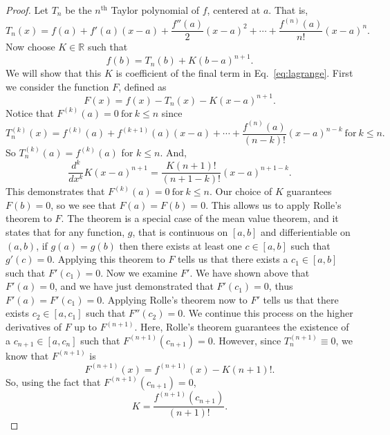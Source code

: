 \documentclass[12pt,twocolumn]{article}
\begin{document}
\begin{proof}
Let $T_n$ be the $n^\mathrm{th}$ Taylor polynomial of $f$, centered at $a$. That is,
\begin{equation}
T_n(x) = f(a) + f'(a)(x-a) + \frac{f''(a)}{2}(x-a)^2 + \cdots + \frac{f^{(n)}(a)}{n!}(x-a)^n.
\end{equation}
Now choose $K\in\mathbb{R}$ such that
\begin{equation}
\label{eq:K}
f(b) = T_n(b) + K(b-a)^{n+1}.
\end{equation}
We will show that this $K$ is coefficient of the final term in Eq.~\ref{eq:lagrange}. First we consider the function $F$, defined as
\begin{equation}
F(x) = f(x) - T_n(x) - K(x-a)^{n+1}.
\end{equation}
Notice that $F^{(k)}(a)=0~\mathrm{for}~k\leq n$ since
\begin{equation}
T_n^{(k)}(x) = f^{(k)}(a) + f^{(k+1)}(a)(x-a) + \cdots + \frac{f^{(n)}(a)}{(n-k)!}(x-a)^{n-k}~\mathrm{for}~k\leq n.
\end{equation}
So $T_n^{(k)}(a)=f^{(k)}(a)$ for $k\leq n$. And,
\begin{equation}
\frac{d^k}{dx^k}K(x-a)^{n+1} = \frac{K(n+1)!}{(n+1-k)!}(x-a)^{n+1-k}.
\end{equation}
This demonstrates that $F^{(k)}(a)=0~\mathrm{for}~k\leq n$. Our choice of $K$ guarantees $F(b)=0$, so we see that $F(a)=F(b)=0$. This allows us to apply Rolle's theorem to $F$. The theorem is a special case of the mean value theorem, and it states that for any function, $g$, that is continuous on $[a,b]$ and differientiable on $(a,b)$, if $g(a)=g(b)$ then there exists at least one $c\in[a,b]$ such that $g'(c)=0$. Applying this theorem to $F$ tells us that there exists a $c_1\in[a,b]$ such that $F'(c_1)=0$. Now we examine $F'$. We have shown above that $F'(a)=0$, and we have just demonstrated that $F'(c_1)=0$, thus $F'(a)=F'(c_1)=0$. Applying Rolle's theorem now to $F'$ tells us that there exists $c_2\in[a,c_1]$ such that $F''(c_2)=0$. We continue this process on the higher derivatives of $F$ up to $F^{(n+1)}$. Here, Rolle's theorem guarantees the existence of a $c_{n+1}\in[a,c_n]$ such that $F^{(n+1)}(c_{n+1})=0$. However, since $T_n^{(n+1)}\equiv 0$, we know that $F^{(n+1)}$ is
\begin{equation}
F^{(n+1)}(x) = f^{(n+1)}(x) - K(n+1)!.
\end{equation}
So, using the fact that $F^{(n+1)}(c_{n+1})=0$,
\begin{equation}
K = \frac{f^{(n+1)}(c_{n+1})}{(n+1)!}.

\end{equation}
\end{proof}
\end{document}
